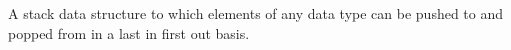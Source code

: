 A stack data structure to which elements of any data type can be pushed to and popped from in a last in first out basis. 